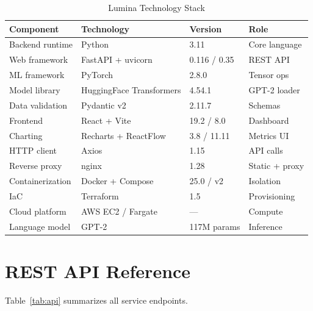 \documentclass[conference]{IEEEtran}
\begin{document}
\begin{table}[htbp]
\centering
\caption{Lumina Technology Stack}
\label{tab:stack}
\renewcommand{\arraystretch}{1.15}
\begin{tabular}{llll}
\toprule
\textbf{Component}   & \textbf{Technology}       & \textbf{Version} & \textbf{Role} \\
\midrule
Backend runtime      & Python                    & 3.11             & Core language \\
Web framework        & FastAPI + uvicorn          & 0.116 / 0.35     & REST API      \\
ML framework         & PyTorch                   & 2.8.0            & Tensor ops    \\
Model library        & HuggingFace Transformers  & 4.54.1           & GPT-2 loader  \\
Data validation      & Pydantic v2               & 2.11.7           & Schemas       \\
Frontend             & React + Vite              & 19.2 / 8.0       & Dashboard     \\
Charting             & Recharts + ReactFlow      & 3.8 / 11.11      & Metrics UI    \\
HTTP client          & Axios                     & 1.15             & API calls     \\
Reverse proxy        & nginx                     & 1.28             & Static + proxy\\
Containerization     & Docker + Compose          & 25.0 / v2        & Isolation     \\
IaC                  & Terraform                 & 1.5              & Provisioning  \\
Cloud platform       & AWS EC2 / Fargate         & ---              & Compute       \\
Language model       & GPT-2                     & 117M params      & Inference     \\
\bottomrule
\end{tabular}
\end{table}

\section{REST API Reference}

Table~\ref{tab:api} summarizes all service endpoints.
\end{document}
